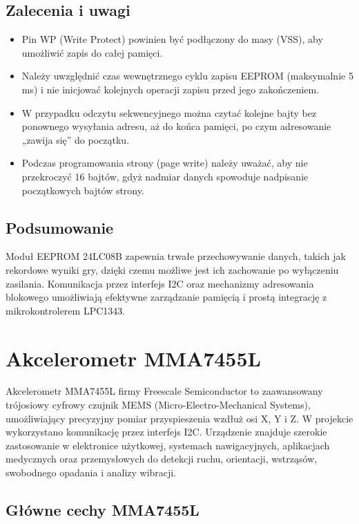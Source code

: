 \documentclass[letterpaper,11pt]{report}
\begin{document}
\subsection*{Zalecenia i uwagi}

\begin{itemize}
    \item Pin WP (Write Protect) powinien być podłączony do masy (VSS), aby umożliwić zapis do całej pamięci.
    \item Należy uwzględnić czas wewnętrznego cyklu zapisu EEPROM (maksymalnie 5 ms) i nie inicjować kolejnych operacji zapisu przed jego zakończeniem.
    \item W przypadku odczytu sekwencyjnego można czytać kolejne bajty bez ponownego wysyłania adresu, aż do końca pamięci, po czym adresowanie „zawija się” do początku.
    \item Podczas programowania strony (page write) należy uważać, aby nie przekroczyć 16 bajtów, gdyż nadmiar danych spowoduje nadpisanie początkowych bajtów strony.
\end{itemize}

\subsection*{Podsumowanie}

Moduł EEPROM 24LC08B zapewnia trwałe przechowywanie danych, takich jak rekordowe wyniki gry, dzięki czemu możliwe jest ich zachowanie po wyłączeniu zasilania. Komunikacja przez interfejs I2C oraz mechanizmy adresowania blokowego umożliwiają efektywne zarządzanie pamięcią i prostą integrację z mikrokontrolerem LPC1343.

\section{Akcelerometr MMA7455L}

Akcelerometr MMA7455L firmy Freescale Semiconductor to zaawansowany trójosiowy cyfrowy czujnik MEMS (Micro-Electro-Mechanical Systems), umożliwiający precyzyjny pomiar przyspieszenia wzdłuż osi X, Y i Z. W projekcie wykorzystano komunikację przez interfejs I2C. Urządzenie znajduje szerokie zastosowanie w elektronice użytkowej, systemach nawigacyjnych, aplikacjach medycznych oraz przemysłowych do detekcji ruchu, orientacji, wstrząsów, swobodnego opadania i analizy wibracji.

\subsection{Główne cechy MMA7455L}
\end{document}
